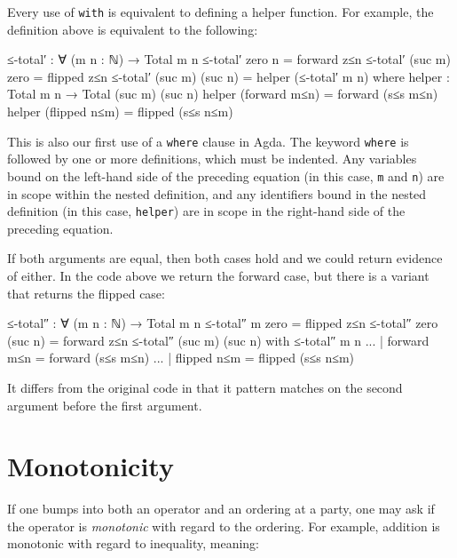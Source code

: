 Every use of \texttt{with} is equivalent to defining a helper function.
For example, the definition above is equivalent to the following:

\begin{fence}
\begin{code}
≤-total′ : ∀ (m n : ℕ) → Total m n
≤-total′ zero    n        =  forward z≤n
≤-total′ (suc m) zero     =  flipped z≤n
≤-total′ (suc m) (suc n)  =  helper (≤-total′ m n)
  where
  helper : Total m n → Total (suc m) (suc n)
  helper (forward m≤n)  =  forward (s≤s m≤n)
  helper (flipped n≤m)  =  flipped (s≤s n≤m)
\end{code}
\end{fence}

This is also our first use of a \texttt{where} clause in Agda. The
keyword \texttt{where} is followed by one or more definitions, which
must be indented. Any variables bound on the left-hand side of the
preceding equation (in this case, \texttt{m} and \texttt{n}) are in
scope within the nested definition, and any identifiers bound in the
nested definition (in this case, \texttt{helper}) are in scope in the
right-hand side of the preceding equation.

If both arguments are equal, then both cases hold and we could return
evidence of either. In the code above we return the forward case, but
there is a variant that returns the flipped case:

\begin{fence}
\begin{code}
≤-total″ : ∀ (m n : ℕ) → Total m n
≤-total″ m       zero                      =  flipped z≤n
≤-total″ zero    (suc n)                   =  forward z≤n
≤-total″ (suc m) (suc n) with ≤-total″ m n
...                        | forward m≤n   =  forward (s≤s m≤n)
...                        | flipped n≤m   =  flipped (s≤s n≤m)
\end{code}
\end{fence}

It differs from the original code in that it pattern matches on the
second argument before the first argument.

\hypertarget{monotonicity}{%
\section{Monotonicity}\label{monotonicity}}

If one bumps into both an operator and an ordering at a party, one may
ask if the operator is \emph{monotonic} with regard to the ordering. For
example, addition is monotonic with regard to inequality, meaning:

